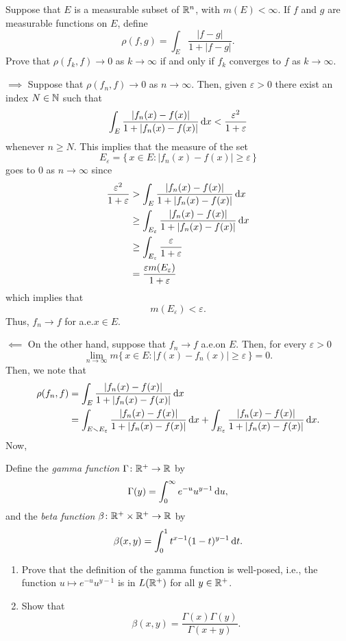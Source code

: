 \begin{problem}
  Suppose that \(E\) is a measurable subset of \(\mathbb{R}^n\), with
  \(m(E)<\infty\). If \(f\) and \(g\) are measurable functions on \(E\),
  define
  \[
    \rho(f,g)=\int_E\frac{|f-g|}{1+|f-g|}.
  \]
  Prove that \(\rho(f_k,f)\to 0\) as \(k\to\infty\) if and only if \(f_k\)
  converges to \(f\) as \(k\to\infty\).
\end{problem}
\begin{solution}
  \(\implies\) Suppose that \(\rho(f_n,f)\to 0\) as \(n\to\infty\). Then,
  given \(\varepsilon>0\) there exist an index \(N\in\mathbb{N}\) such that
  \[
    \int_E \frac{|f_n(x)-f(x)|}{1+|f_n(x)-f(x)|}\mathop{}\!\mathrm{d} x
    <\frac{\varepsilon^2}{1+\varepsilon}
  \]
  whenever \(n\geq N\). This implies that the measure of the set
  \[
    E_\varepsilon=\bigr\{\,x\in E:|f_n(x)-f(x)|\geq\varepsilon\,\bigl\}
  \]
  goes to \(0\) as \(n\to\infty\) since
  \begin{align*}
    \frac{\varepsilon^2}{1+\varepsilon}
    &>\int_E \frac{|f_n(x)-f(x)|}{1+|f_n(x)-f(x)|}\mathop{}\!\mathrm{d} x\\
    &\geq \int_{E_\varepsilon}
    \frac{|f_n(x)-f(x)|}{1+|f_n(x)-f(x)|}\mathop{}\!\mathrm{d} x\\
    &\geq\int_{E_\varepsilon}\frac{\varepsilon}{1+\varepsilon}\\
    &=\frac{\varepsilon m(E_\varepsilon)}{1+\varepsilon}
  \end{align*}
  which implies that
  \[
    m(E_\varepsilon)<\varepsilon.
  \]
  Thus, \(f_n\to f\) for a.e.\@ \(x\in E\).

  \(\impliedby\) On the other hand, suppose that \(f_n\to f\) a.e.\@ on
  \(E\). Then, for every \(\varepsilon>0\)
  \[
    \lim_{n\to\infty}m\bigl\{\,x\in
    E:|f(x)-f_n(x)|\geq\varepsilon\,\bigr\}=0.
  \]
  Then, we note that
  \begin{align*}
    \rho(f_n,f)
    &=\int_E \frac{|f_n(x)-f(x)|}{1+|f_n(x)-f(x)|}\mathop{}\!\mathrm{d} x\\
    &=\int_{E\smallsetminus E_\varepsilon} \frac{|f_n(x)-f(x)|}{1+|f_n(x)-f(x)|}\mathop{}\!\mathrm{d} x
      +\int_{E_\varepsilon} \frac{|f_n(x)-f(x)|}{1+|f_n(x)-f(x)|}\mathop{}\!\mathrm{d} x.
  \end{align*}
  Now,
\end{solution}

\begin{problem}
  Define the \emph{gamma function} \(\Gamma\colon\mathbb{R}^+\to\mathbb{R}\) by
  \[
    \Gamma(y)=\int_0^\infty e^{-u}u^{y-1}\mathop{}\!\mathrm{d} u,
  \]
  and the \emph{beta function} \(\beta\colon\mathbb{R}^+\times\mathbb{R}^+\to\mathbb{R}\) by
  \[
    \beta(x,y)=\int_0^1 t^{x-1}(1-t)^{y-1}\mathop{}\!\mathrm{d} t.
  \]
  \begin{enumerate}[label=(\alph*)]
  \item Prove that the definition of the gamma function is well-posed,
    i.e., the function \(u\mapsto e^{-u}u^{y-1}\) is in \(L(\mathbb{R}^+)\) for
    all \(y\in\mathbb{R}^+\).
  \item Show that
    \[
      \beta(x,y)=\frac{\Gamma(x)\Gamma(y)}{\Gamma(x+y)}.
    \]
  \end{enumerate}
\end{problem}
\begin{solution}
\end{solution}

